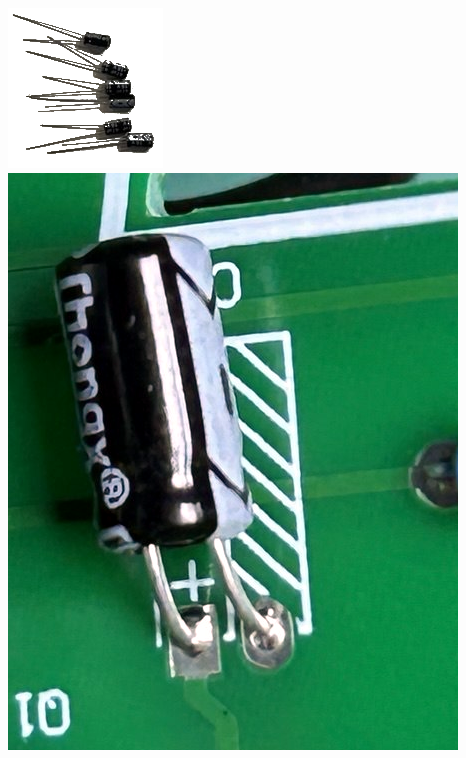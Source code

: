 \documentclass[10pt]{article}
\begin{document}
	\begin{minipage}{0.15\textwidth}\raggedright
	\includegraphics[width=\linewidth, right]{elko.png}
	\includegraphics[width=\linewidth, right]{elko-place.png}
	\end{minipage}
	
\end{document}
